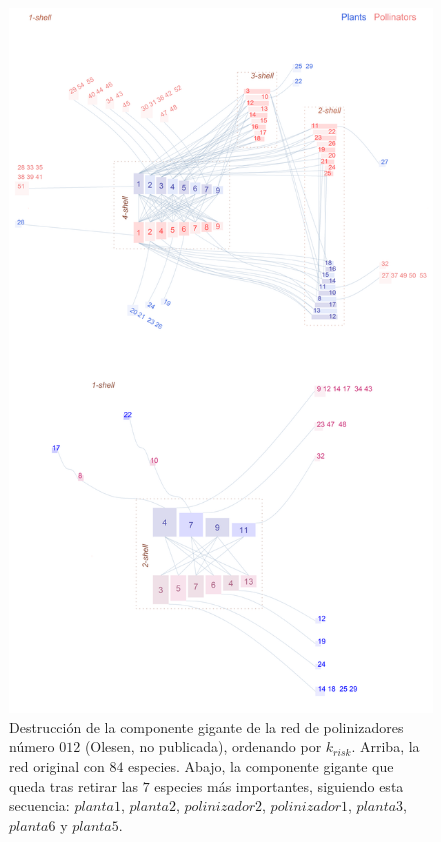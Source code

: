 \begin{figure}[htp!]
\centering
\includegraphics[scale=0.12]{Figures/DEST_M_PL_012_ziggurat_hf_destruction.png}
\caption {Destrucción de la componente gigante de la red de polinizadores número $012$ (Olesen, no publicada), ordenando por $k_{risk}$. Arriba, la red original con $84$ especies. Abajo, la componente gigante que queda tras retirar las $7$ especies más importantes, siguiendo esta secuencia: $planta1$, $planta2$, $polinizador2$, $polinizador1$, $planta3$, $planta6$ y $planta5$.}
\label{fig:DEST_M_PL_012_ziggurat_hf_destruction}
\end{figure}

